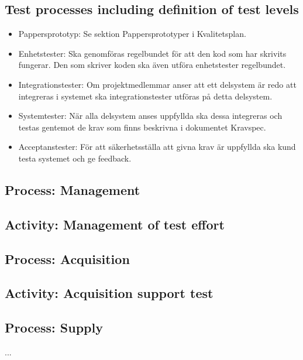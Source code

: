 \documentclass[a4paper,10pt]{article}
\begin{document}
\subsection{Test processes including definition of test levels}
\begin{itemize}
	\item Pappersprototyp: Se sektion Pappersprototyper i Kvalitetsplan.
	\item Enhetstester: Ska genomföras regelbundet för att den kod som har skrivits fungerar. Den som skriver koden ska även utföra enhetstester regelbundet. 
	\item Integrationstester: Om projektmedlemmar anser att ett delsystem är redo att integreras i systemet ska integrationstester utföras på detta delsystem. 
	\item Systemtester: När alla delsystem anses uppfyllda ska dessa integreras och testas gentemot de krav som finns beskrivna i dokumentet Kravspec. 
	\item Acceptanstester: För att säkerhetsställa att givna krav är uppfyllda ska kund testa systemet och ge feedback.
\end{itemize}

\subsection{Process: Management}
\subsection{Activity: Management of test effort}
\subsection{Process: Acquisition}
\subsection{Activity: Acquisition support test}
\subsection{Process: Supply}

...
\end{document}
